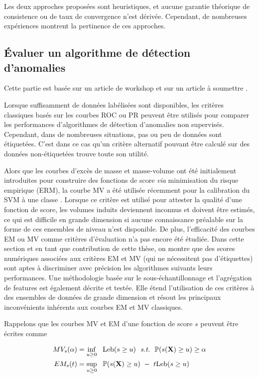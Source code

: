 \documentclass[a4paper, 12pt]{article}
\newcommand{\st}{\emph{s.t.}{}}
\def\mb{\mathbf}
\def\leb{\text{Leb}}
\begin{document}
Les deux approches proposées sont heuristiques, et aucune garantie théorique de consistence ou de taux de convergence n'est dérivée. Cependant, de nombreuses expériences montrent la pertinence de ces approches.

\subsection{Évaluer un algorithme de détection d'anomalies}
\label{resume_fr:evaluation}
Cette partie est basée sur un article de workshop \citep{ICMLworkshop16} et sur un article à soumettre \citep{NIPS16evaluation}.


Lorsque suffisamment de données labélisées sont disponibles, les critères classiques basés sur les courbes ROC \citep{Provost1997, Provost1998, Fawcett2006} ou PR \citep{Davis2006, Clemencon2009} peuvent être utilisés pour comparer les performances d'algorithmes de détection d'anomalies non supervisés. Cependant, dans de nombreuses situations, pas ou peu de données sont étiquetées. C'est dans ce cas qu'un critère alternatif pouvant être calculé sur des données non-étiquetées trouve toute son utilité.

Alors que les courbes d'excès de masse et masse-volume ont été initialement introduites pour construire des fonctions de score \emph{via} minimisation du risque empirique (ERM), la courbe MV a été utilisée récemment pour la calibration du SVM à une classe \citep{Thomas2015}.
Lorsque ce critère est utilisé pour attester la qualité d'une fonction de score, les volumes induits deviennent inconnus et doivent être estimés, ce qui est difficile en grande dimension si aucune connaissance préalable sur la forme de ces ensembles de niveau n'est disponible.
%
De plus, l'efficacité des courbes EM ou MV comme critères d'évaluation n'a pas encore été étudiée.
%
Dans cette section et en tant que contribution de cette thèse, on montre que des scores numériques associées aux critères EM et MV (qui ne nécessitent pas d'étiquettes) sont aptes à discriminer avec précision les algorithmes suivants leurs performances.
%
Une méthodologie basée sur le sous-échantillonnage et l'agrégation de features est également décrite et testée. Elle étend l'utilisation de ces critères à des ensembles de données de grande dimension et résout les principaux inconvénients inhérents aux courbes EM et MV classiques.

Rappelons que les courbes MV et EM d'une fonction de score $s$ peuvent être écrites comme

\begin{align}
\label{resume_fr:intro:MV-def}
 MV_s(\alpha) &= \inf_{u \ge 0}~~ \leb(s \ge u) ~~\st~~\mathbb{P}(s(\mb X) \ge u) \ge \alpha\\
\label{resume_fr:intro:EM-def}
 EM_s(t) &= \sup_{u \ge 0}~~ \mathbb{P}(s(\mb X) \ge u) ~-~ t \leb(s \ge u)
\end{align}
\end{document}
